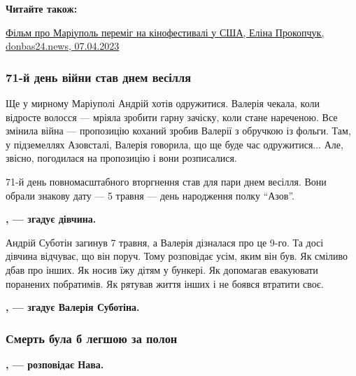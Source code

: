 \textbf{Читайте також:} 

\href{https://donbas24.news/news/film-pro-mariupol-peremig-na-kinofestivali-u-ssa}{%
Фільм про Маріуполь переміг на кінофестивалі у США, Еліна Прокопчук, donbas24.news, 07.04.2023}

\subsubsection{71-й день війни став днем весілля}

Ще у мирному Маріуполі Андрій хотів одружитися. Валерія чекала, коли відросте
волосся — мріяла зробити гарну зачіску, коли стане нареченою. Все змінила війна
— пропозицію коханий зробив Валерії з обручкою із фольги. Там, у підземеллях
Азовсталі, Валерія говорила, що ще буде час одружитися... Але, звісно, погодилася
на пропозицію і вони розписалися.

71-й день повномасштабного вторгнення став для пари днем весілля. Вони обрали
знакову дату — 5 травня — день народження полку \enquote{Азов}.

\begin{leftbar}
	\begingroup
		\bfseries
{}, — згадує дівчина.
	\endgroup
\end{leftbar}


Андрій Суботін загинув 7 травня, а Валерія дізналася про це 9-го. Та досі
дівчина відчуває, що він поруч. Тому розповідає усім, яким він був. Як сміливо
дбав про інших. Як носив їжу дітям у бункері. Як допомагав евакуювати поранених
побратимів. Як рятував життя інших і не боявся втратити своє.

\begin{leftbar}
	\begingroup
		\bfseries
{}, — згадує Валерія Суботіна.
	\endgroup
\end{leftbar}

\subsubsection{Смерть була б легшою за полон}

\begin{leftbar}
	\begingroup
		\bfseries
{}, — розповідає Нава.
	\endgroup
\end{leftbar}

